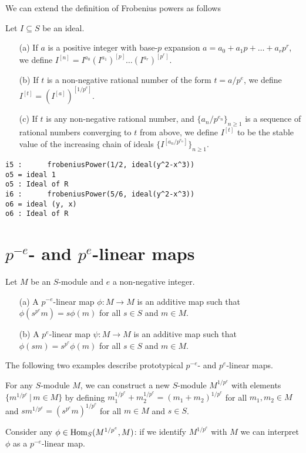 \documentclass[11pt]{amsart}
\begin{document}
We can extend the definition of Frobenius powers as follows
\begin{definition}
Let  $I\subseteq S$ be an ideal.
\begin{enumerate}
 \item[(a)] If $a$ is a positive integer with base-$p$ expansion  $a=a_0 + a_1 p +  \dots + a_r p^r$, we define
 $I^{[n]}=I^{a_0} \left(I^{a_1}\right)^{[p]} \dots  (I^{a_r})^{[p^r]}$. %
 \item[(b)] If $t$ is a non-negative rational number of the form $t = a/p^e$, we define  $I^{[t]} = (I^{[a]})^{[1/p^e]}.$
 \item[(c)] If $t$ is any non-negative rational number, and $\{a_n/p^{e_n}\}_{n\geq 1}$ is a sequence of rational numbers converging to $t$ from above, we define $I^{[t]}$
 to be the stable value of the increasing chain of ideals $\{I^{[a_n/p^{e_n}]}\}_{n\geq 1}$.

\end{enumerate}
\end{definition}


\begin{verbatim}
i5 :      frobeniusPower(1/2, ideal(y^2-x^3))
o5 = ideal 1
o5 : Ideal of R
i6 :      frobeniusPower(5/6, ideal(y^2-x^3))
o6 = ideal (y, x)
o6 : Ideal of R
\end{verbatim}



\section{$p^{-e}$- and $p^{e}$-linear maps}\label{Section: p-linear maps}

\begin{definition}%
Let  $M$ be an $S$-module and $e$ a non-negative integer.
\begin{enumerate}
 \item[(a)] A $p^{-e}$-linear map $\phi:M \rightarrow M$ is an additive map such that
 $\phi(s^{p^e} m)= s\phi(m)$ for all $s\in S$ and $m\in M$.
 \item[(b)] A $p^{e}$-linear map $\psi:M \rightarrow M$ is an additive map such that
 $\phi(s m)= s^{p^e}\phi(m)$ for all $s\in S$ and $m\in M$.
\end{enumerate}
\end{definition}


The following two examples describe  prototypical
$p^{-e}$- and $p^{e}$-linear maps.
\begin{example}
For any $S$-module $M$, we can construct a new $S$-module $M^{1/p^e}$ with elements $\{  m^{1/p^e} \,|\,m\in M\}$ by defining
$m_1^{1/p^e} +  m_2^{1/p^e} =  (m_1 +  m_2)^{1/p^e}$ for all $m_1, m_2 \in M$ and
$s  m^{1/p^e}=  (s^{p^e} m)^{1/p^e}$ for all $m\in M$ and $s\in S$.

Consider any $\phi\in \operatorname{Hom}_S(M^{1/p^e}, M)$: if we identify $M^{1/p^e}$ with $M$ we can interpret $\phi$ as a $p^{-e}$-linear map.
\end{example}
\end{document}
